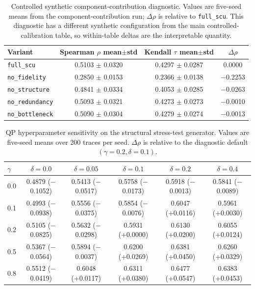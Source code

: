 \documentclass[a4paper,fleqn]{cas-sc}
\begin{document}
\begin{table}[ht]
\caption{Controlled synthetic component-contribution diagnostic. Values are five-seed means from the component-contribution run; $\Delta\rho$ is relative to \texttt{full\_scu}. This diagnostic has a different synthetic configuration from the main controlled-calibration table, so within-table deltas are the interpretable quantity.}
\label{tab:supp-ablation}
\centering
\small
\begin{tabular}{lccc}
\toprule
\textbf{Variant} & \textbf{Spearman $\rho$ mean$\pm$std} & \textbf{Kendall $\tau$ mean$\pm$std} & \textbf{$\Delta\rho$} \\
\midrule
\texttt{full\_scu} & 0.5103 $\pm$ 0.0320 & 0.4297 $\pm$ 0.0287 & 0.0000 \\
\texttt{no\_fidelity} & 0.2850 $\pm$ 0.0153 & 0.2366 $\pm$ 0.0138 & $-$0.2253 \\
\texttt{no\_structure} & 0.4841 $\pm$ 0.0334 & 0.4053 $\pm$ 0.0285 & $-$0.0263 \\
\texttt{no\_redundancy} & 0.5093 $\pm$ 0.0321 & 0.4273 $\pm$ 0.0273 & $-$0.0010 \\
\texttt{no\_bottleneck} & 0.5090 $\pm$ 0.0304 & 0.4279 $\pm$ 0.0274 & $-$0.0013 \\
\bottomrule
\end{tabular}
\end{table}

\begin{table}[ht]
\caption{QP hyperparameter sensitivity on the structural stress-test generator. Values are five-seed means over 200 traces per seed. $\Delta\rho$ is relative to the diagnostic default $(\gamma=0.2,\delta=0.1)$.}
\label{tab:supp-gamma-delta-sensitivity}
\centering
\small
\begin{tabular}{lccccc}
\toprule
\textbf{$\gamma$} & \textbf{$\delta=0.0$} & \textbf{$\delta=0.05$} & \textbf{$\delta=0.1$} & \textbf{$\delta=0.2$} & \textbf{$\delta=0.4$} \\
\midrule
0.0 & 0.4879 ($-$0.1052) & 0.5413 ($-$0.0517) & 0.5758 ($-$0.0173) & 0.5918 ($-$0.0013) & 0.5841 ($-$0.0089) \\
0.1 & 0.4993 ($-$0.0938) & 0.5556 ($-$0.0375) & 0.5854 ($-$0.0076) & 0.6047 (+0.0116) & 0.5961 (+0.0030) \\
0.2 & 0.5105 ($-$0.0825) & 0.5632 ($-$0.0298) & 0.5931 (+0.0000) & 0.6130 (+0.0200) & 0.6055 (+0.0124) \\
0.5 & 0.5367 ($-$0.0564) & 0.5894 ($-$0.0037) & 0.6200 (+0.0269) & 0.6381 (+0.0450) & 0.6260 (+0.0329) \\
0.8 & 0.5512 ($-$0.0419) & 0.6048 (+0.0117) & 0.6311 (+0.0380) & 0.6477 (+0.0547) & 0.6383 (+0.0453) \\
\bottomrule
\end{tabular}
\end{table}
\end{document}
